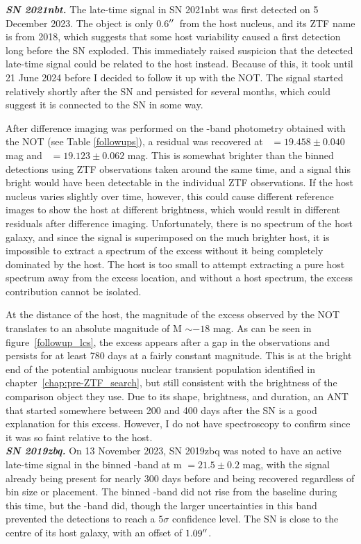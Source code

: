 \documentclass[a4paper,oneside,12pt, class=Latex/Classes/PhDthesisPSnPDF, crop=false]{standalone}
\begin{document}
\textit{\textbf{SN 2021nbt.}}
The late-time signal in SN 2021nbt was first detected on 5 December 2023. The object is only 0.6$^{\prime\prime}$\ from the host nucleus, and its ZTF name is from 2018, which suggests that some host variability caused a first detection long before the SN exploded. This immediately raised suspicion that the detected late-time signal could be related to the host instead. Because of this, it took until 21 June 2024 before I decided to follow it up with the NOT. The signal started relatively shortly after the SN and persisted for several months, which could suggest it is connected to the SN in some way.

After difference imaging was performed on the \ztfr\ztfi-band photometry obtained with the NOT (see Table \ref{followups}), a residual was recovered at \ztfr\ $= 19.458\pm0.040$ mag and \ztfi~$= 19.123\pm0.062$ mag. This is somewhat brighter than the binned detections using ZTF observations taken around the same time, and a signal this bright would have been detectable in the individual ZTF observations. If the host nucleus varies slightly over time, however, this could cause different reference images to show the host at different brightness, which would result in different residuals after difference imaging. Unfortunately, there is no spectrum of the host galaxy, and since the signal is superimposed on the much brighter host, it is impossible to extract a spectrum of the excess without it being completely dominated by the host. The host is too small to attempt extracting a pure host spectrum away from the excess location, and without a host spectrum, the excess contribution cannot be isolated.

At the distance of the host, the magnitude of the excess observed by the NOT translates to an absolute magnitude of M $\sim -18$ mag. As can be seen in figure~\ref{followup_lcs}, the excess appears after a gap in the observations and persists for at least 780 days at a fairly constant magnitude. This is at the bright end of the potential ambiguous nuclear transient \citep{2020ohl_Hinkle} population identified in chapter~\ref{chap:pre-ZTF_search}, but still consistent with the brightness of the comparison object they use. Due to its shape, brightness, and duration, an ANT that started somewhere between 200 and 400 days after the SN is a good explanation for this excess. However, I do not have spectroscopy to confirm since it was so faint relative to the host.\\


\textit{\textbf{SN 2019zbq.}}
On 13 November 2023, SN 2019zbq was noted to have an active late-time signal in the binned \ztfr-band at m $=21.5\pm0.2$ mag, with the signal already being present for nearly 300 days before and being recovered regardless of bin size or placement. The binned \ztfg-band did not rise from the baseline during this time, but the \ztfi-band did, though the larger uncertainties in this band prevented the detections to reach a $5\sigma$ confidence level. The SN is close to the centre of its host galaxy, with an offset of $1.09^{\prime\prime}$.
\end{document}
